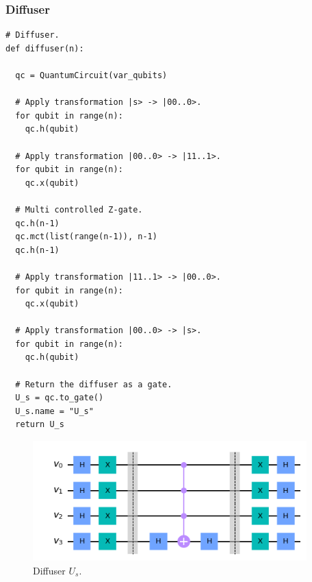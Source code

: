 \documentclass{article}
\begin{document}
\subsubsection{Diffuser}
\begin{verbatim}
# Diffuser.
def diffuser(n):

  qc = QuantumCircuit(var_qubits)

  # Apply transformation |s> -> |00..0>.
  for qubit in range(n):
    qc.h(qubit)

  # Apply transformation |00..0> -> |11..1>.
  for qubit in range(n):
    qc.x(qubit)

  # Multi controlled Z-gate.
  qc.h(n-1)
  qc.mct(list(range(n-1)), n-1)
  qc.h(n-1)

  # Apply transformation |11..1> -> |00..0>.
  for qubit in range(n):
    qc.x(qubit)

  # Apply transformation |00..0> -> |s>.
  for qubit in range(n):
    qc.h(qubit)

  # Return the diffuser as a gate.
  U_s = qc.to_gate()
  U_s.name = "U_s"
  return U_s
\end{verbatim}
\begin{figure}[H]
  \centering
  \includegraphics[width=300pt]{Img/us-circuit.png}
  \caption{Diffuser $U_s$.}
\end{figure}
\end{document}
